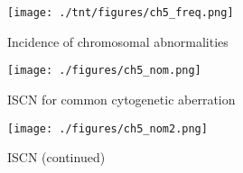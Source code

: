 \documentclass{scrartcl}
\begin{document}
\begin{figure}[htbp]
\centering
\texttt{[image: ./tnt/figures/ch5\_freq.png]}
\caption{\label{fig:orged97cd3}
Incidence of chromosomal abnormalities}
\end{figure}

\begin{figure}[htbp]
\centering
\texttt{[image: ./figures/ch5\_nom.png]}
\caption{\label{fig:orgcba64dd}
ISCN for common cytogenetic aberration}
\end{figure}

\begin{figure}[htbp]
\centering
\texttt{[image: ./figures/ch5\_nom2.png]}
\caption{\label{fig:org523e1cc}
ISCN (continued)}
\end{figure}
\end{document}
